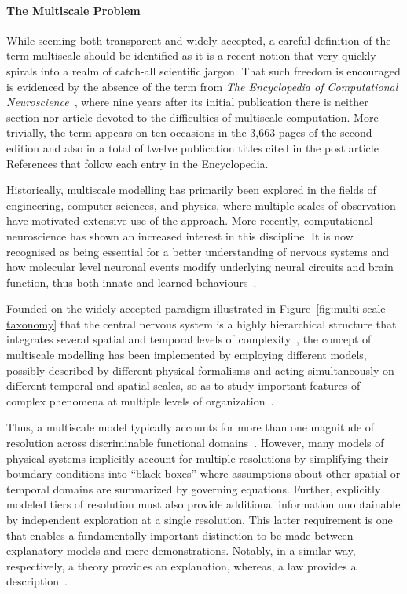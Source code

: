 \documentclass[11pt,3p,twocolumn]{JMN}
\begin{document}
\paragraph{The Multiscale Problem}
While seeming both transparent and widely accepted, a careful definition of the term multiscale should be identified as it is a recent notion that very quickly spirals into a realm of catch-all scientific jargon. That such freedom is encouraged is evidenced by the absence of the term from \textit{The Encyclopedia of Computational Neuroscience}~\citep{jung22}, where nine years after its initial publication there is neither section nor article devoted to the difficulties of multiscale computation. More trivially, the term appears on ten occasions in the 3,663 pages of the second edition and also in a total of twelve publication titles cited in the post article References that follow each entry in the Encyclopedia.

Historically, multiscale modelling has primarily been explored in the fields of engineering, computer sciences, and physics, where multiple scales of observation have motivated extensive use of the approach. More recently, computational neuroscience has shown an increased interest in this discipline. It is now recognised as being essential for a better understanding of nervous systems and how molecular level neuronal events modify underlying neural circuits and brain function, thus both innate and learned behaviours~\citep{bouteiller11}.

Founded on the widely accepted paradigm illustrated in Figure~\ref{fig:multi-scale-taxonomy} that the central nervous system is a highly hierarchical structure that integrates several spatial and temporal levels of complexity~\citep{bouteiller11}, the concept of multiscale modelling has been implemented by employing different models, possibly described by different physical formalisms and acting simultaneously on different temporal and spatial scales, so as to study important features of complex phenomena at multiple levels of organization~\citep{djurfeldt07}.

Thus, a multiscale model typically accounts for more than one magnitude of resolution across discriminable functional domains~\citep{walpole13}. However, many models of physical systems implicitly account for multiple resolutions by simplifying their boundary conditions into “black boxes” where assumptions about other spatial or temporal domains are summarized by governing equations. Further, explicitly modeled tiers of resolution must also provide additional information unobtainable by independent exploration at a single resolution. This latter requirement is one that enables a fundamentally important distinction to be made between explanatory models and mere demonstrations. Notably, in a similar way, respectively, a theory provides an explanation, whereas, a law provides a description~\citep{schurger22}.
\end{document}
